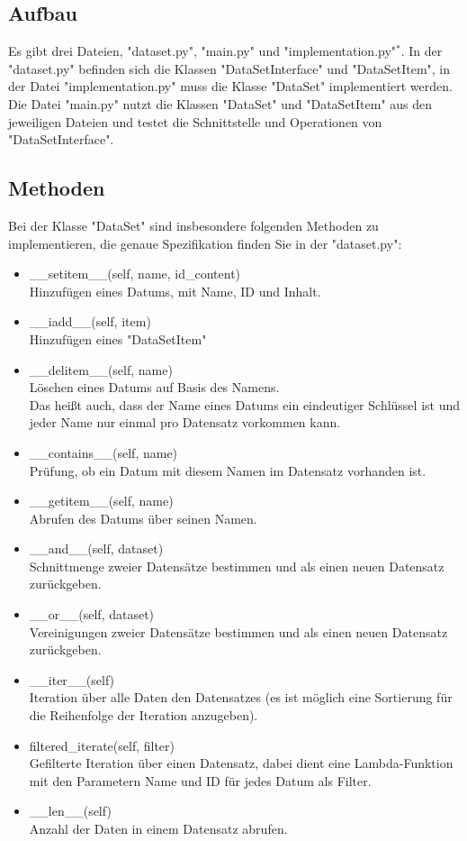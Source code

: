 \documentclass[]{article}
\begin{document}
\subsection{Aufbau}
Es gibt drei Dateien, "dataset.py", "main.py" und "implementation.py"$^*$.
In der "dataset.py" befinden sich die Klassen "DataSetInterface" und "DataSetItem",
in der Datei "implementation.py" muss die Klasse "DataSet" implementiert werden.
Die Datei "main.py" nutzt die Klassen "DataSet" und "DataSetItem" aus den jeweiligen Dateien und testet die Schnittstelle und Operationen von "DataSetInterface".\\

\subsection{Methoden}
Bei der Klasse "DataSet" sind insbesondere folgenden Methoden zu implementieren, die genaue Spezifikation finden Sie in der "dataset.py":\\

\begin{itemize}
\item \_\_setitem\_\_(self, name, id\_content)\\
Hinzufügen eines Datums, mit Name, ID und Inhalt.
\item \_\_iadd\_\_(self, item)\\
Hinzufügen eines "DataSetItem"
\item \_\_delitem\_\_(self, name)\\
Löschen eines Datums auf Basis des Namens.\\
Das heißt auch, dass der Name eines Datums ein eindeutiger Schlüssel ist und jeder Name nur einmal pro Datensatz vorkommen kann.
\item \_\_contains\_\_(self, name)\\
Prüfung, ob ein Datum mit diesem Namen im Datensatz vorhanden ist.
\item \_\_getitem\_\_(self, name)\\
Abrufen des Datums über seinen Namen.
\item \_\_and\_\_(self, dataset)\\
Schnittmenge zweier Datensätze bestimmen und als einen neuen Datensatz zurückgeben.
\item \_\_or\_\_(self, dataset)\\
Vereinigungen zweier Datensätze bestimmen und als einen neuen Datensatz zurückgeben.
\item \_\_iter\_\_(self)\\
Iteration über alle Daten den Datensatzes (es ist möglich eine Sortierung für die Reihenfolge der Iteration anzugeben).	
\item filtered\_iterate(self, filter)\\
Gefilterte Iteration über einen Datensatz, dabei dient eine Lambda-Funktion mit den Parametern Name und ID für jedes Datum als Filter.
\item \_\_len\_\_(self)\\
Anzahl der Daten in einem Datensatz abrufen.

\end{itemize}
\end{document}
